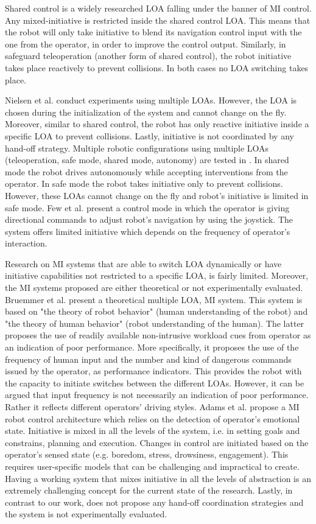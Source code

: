 \documentclass[a4paper,12pt,oneside,openright]{bhamthesis}
\begin{document}
Shared control is a widely researched LOA falling under the banner of MI control. Any mixed-initiative is restricted inside the shared control LOA. This means that the robot will only take initiative to blend its navigation control input with the one from the operator, in order to improve the control output. Similarly, in safeguard teleoperation (another form of shared control), the robot initiative takes place reactively to prevent collisions. In both cases no LOA switching takes place.

Nielsen et al. \cite{Nielsen2008} conduct experiments using multiple LOAs. However, the LOA is chosen during the initialization of the system and cannot change on the fly. Moreover, similar to shared control, the robot has only reactive initiative inside a specific LOA to prevent collisions. Lastly, initiative is not coordinated by any hand-off strategy. Multiple robotic configurations using multiple LOAs (teleoperation, safe mode, shared mode, autonomy) are tested in \cite{Bruemmer2005}. In shared mode the robot drives autonomously while accepting interventions from the operator. In safe mode the robot takes initiative only to prevent collisions. However, these LOAs cannot change on the fly and robot's initiative is limited in safe mode. Few et al. \cite{Few2006} present a control mode in which the operator is giving directional commands to adjust robot's navigation by using the joystick. The system offers limited initiative which depends on the frequency of operator's interaction.

Research on MI systems that are able to switch LOA dynamically or have initiative capabilities not restricted to a specific LOA, is fairly limited. Moreover, the MI systems proposed are either theoretical or not experimentally evaluated.  Bruemmer et al. \cite{Bruemmer2003b} present a theoretical multiple LOA, MI system. This system is based on "the theory of robot behavior" (human understanding of the robot) and  "the theory of human behavior" (robot understanding of the human). The latter proposes the use of readily available non-intrusive workload cues from operator as an indication of poor performance. More specifically, it proposes the use of the frequency of human input and the number and kind of dangerous commands issued by the operator, as performance indicators. This provides the robot with the capacity to initiate switches between the different LOAs. However, it can be argued that input frequency is not necessarily an indication of poor performance. Rather it reflects different operators' driving styles. Adams et al. \cite{Adams2004} propose a MI robot control architecture which relies on the detection of operator's emotional state. Initiative is mixed in all the levels of the system, i.e. in setting goals and constrains, planning and execution. Changes in control are initiated based on the operator's sensed state (e.g. boredom, stress, drowsiness, engagement). This requires user-specific models that can be challenging and impractical to create. Having a working system that mixes initiative in all the levels of abstraction is an extremely challenging concept for the current state of the research. Lastly, in contrast to our work, \cite{Adams2004} does not propose any hand-off coordination strategies and the system is not experimentally evaluated.
\end{document}
